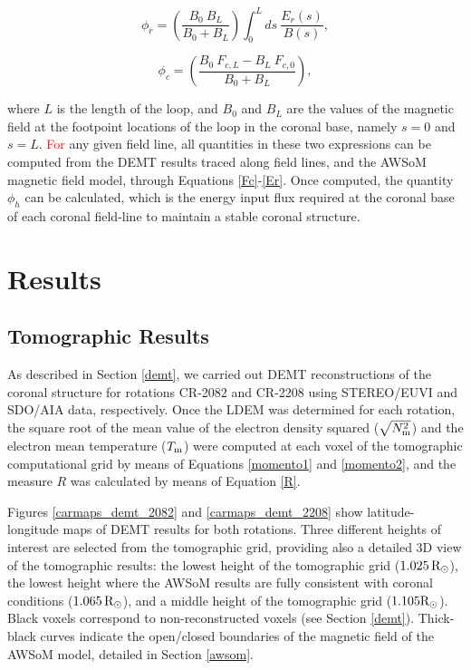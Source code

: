 \documentclass[namedreferences]{solarphysics}
\def\edit#1{\textcolor{Red}{#1}}
\newcommand{\mrsun}{{\rm R_\odot}}
\newcommand{\Tm}{T_{\rm m}}
\newcommand{\Nsqm}{N^2_{{\rm m}}}
\newcommand{\sqravgN}{\sqrt{\Nsqm}}
\begin{document}
\begin{article}
\begin{equation}\label{phi_r}
\phi_r = \left( \frac{B_0 \ B_L}{B_0 + B_L} \right) \int_{0}^{L} ds \ \frac{E_r(s)}{B(s)},
\end{equation}

\begin{equation}\label{phi_c}
\phi_c = \left( \frac{B_0 \ F_{c,L} - B_L \ F_{c,0}}{B_0 + B_L} \right) ,
\end{equation}

\noindent 
{where $L$ is the length of the loop, and $B_0$ and $B_L$ are the values of the magnetic field at the footpoint locations of the loop in the coronal base, namely $s=0$ and $s=L$.} {\edit{For} any given field line, all quantities in these two expressions can be computed {from the DEMT results traced along field lines, and the AWSoM magnetic field model,} through Equations \ref{Fc}-\ref{Er}. Once computed, the quantity $\phi_h$ can be calculated, which is the energy input flux required at the coronal base of each coronal field-line to maintain a stable coronal structure.}

\section{Results}\label{resu} 

\subsection{Tomographic Results}\label{demt_res} 

{As described in Section \ref{demt}, we carried out DEMT reconstructions of the coronal structure for rotations CR-2082 and CR-2208 using STEREO/EUVI and SDO/AIA data, respectively.} {Once the LDEM was determined for each rotation, the square root of the mean value of the electron density squared ($\sqravgN$) and the electron mean temperature ($\Tm$) were computed at each voxel of the tomographic computational grid by means of Equations \ref{momento1} and \ref{momento2}{, and the measure $R$ was calculated by means of Equation \ref{R}.}} 

Figures \ref{carmaps_demt_2082} and \ref{carmaps_demt_2208} show {latitude-longitude} maps of DEMT results for both {rotations. Three different heights {of interest are selected from the tomographic grid}, providing also a detailed 3D view of the tomographic results: the lowest height of {the} tomographic grid ($1.025\,\mrsun$), {the lowest height where the AWSoM results are fully} consistent with coronal conditions ($1.065\,\mrsun$), and a middle height of the tomographic grid ($1.105\mrsun$)}. Black voxels correspond to non-reconstructed voxels ({see} Section \ref{demt}). Thick-black {curves indicate} the {open/closed boundaries of the magnetic field of the} AWSoM model{, detailed in Section \ref{awsom}.} 


\end{article}
\end{document}
